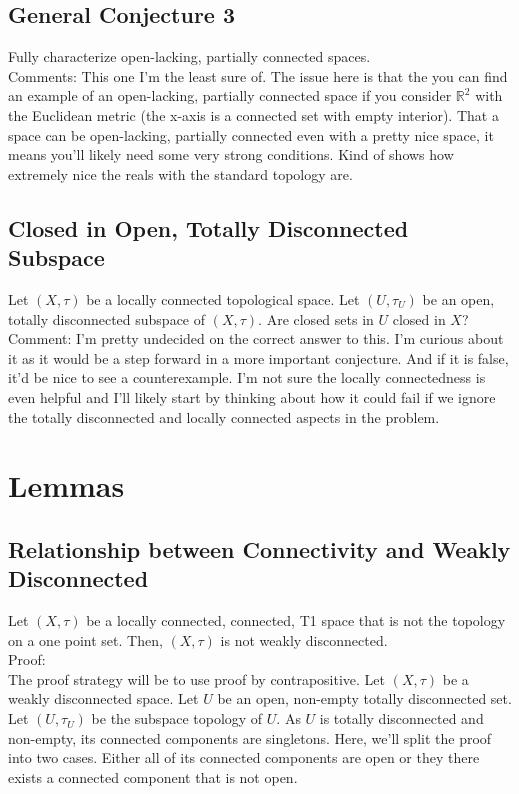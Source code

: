 \documentclass{article}
\begin{document}
\subsection{General Conjecture 3}
Fully characterize open-lacking, partially connected spaces.\\

Comments: This one I'm the least sure of. The issue here is that the you can find an example of an open-lacking, partially connected space if you consider $\mathbb{R}^2$ with the Euclidean metric (the x-axis is a connected set with empty interior). That a space can be open-lacking, partially connected even with a pretty nice space, it means you'll likely need some very strong conditions. Kind of shows how extremely nice the reals with the standard topology are.

\subsection{Closed in Open, Totally Disconnected Subspace}
Let $(X,\tau)$ be a locally connected topological space. Let $(U,\tau_U)$ be an open, totally disconnected subspace of $(X,\tau)$. Are closed sets in $U$ closed in $X$? \\

Comment: I'm pretty undecided on the correct answer to this. I'm curious about it as it would be a step forward in a more important conjecture. And if it is false, it'd be nice to see a counterexample. I'm not sure the locally connectedness is even helpful and I'll likely start by thinking about how it could fail if we ignore the totally disconnected and locally connected aspects in the problem.

\newpage

\section{Lemmas}

\subsection{Relationship between Connectivity and Weakly Disconnected}
Let $(X,\tau)$ be a locally connected, connected, T1 space that is not the topology on a one point set. Then, $(X, \tau)$ is not weakly disconnected.\\

Proof:\\

The proof strategy will be to use proof by contrapositive. Let $(X, \tau)$ be a weakly disconnected space. Let $U$ be an open, non-empty totally disconnected set. Let $(U, \tau_U)$ be the subspace topology of $U$. As $U$ is totally disconnected and non-empty, its connected components are singletons.
Here, we'll split the proof into two cases. Either all of its connected components are open or they there exists a connected component that is not open.\\
\end{document}
